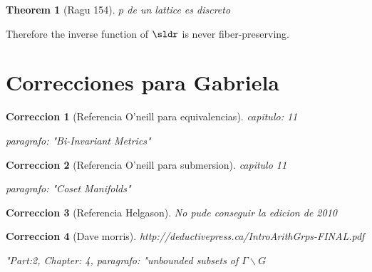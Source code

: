 \documentclass[11pt]{amsart}
\newtheorem{correccion}{Correccion}
\theoremstyle{plain}
\newtheorem{thm}{Theorem}[section]
\theoremstyle{definition}
\theoremstyle{remark}
\begin{document}
\begin{thm} [Ragu 154]
$p$ de un lattice es discreto
\end{thm}


Therefore the inverse function of $\sldr$ is never fiber-preserving.

\newpage

\section{Correcciones para Gabriela}

\begin{correccion}[Referencia O'neill para equivalencias]
\begin{sloppypar}
\item capitulo: 11
\item paragrafo: "Bi-Invariant Metrics"
\end{sloppypar}
\end{correccion}

\begin{correccion}[Referencia O'neill para submersion]
\begin{sloppypar}
\item capitulo 11
\item paragrafo: "Coset Manifolds"
\end{sloppypar}
\end{correccion}

\begin{correccion}[Referencia Helgason]
No pude conseguir la edicion de 2010
\end{correccion}

\begin{correccion}[Dave morris]
\begin{sloppypar}
\item http://deductivepress.ca/IntroArithGrps-FINAL.pdf
\item "Part:2, Chapter: 4, paragrafo: "unbounded subsets of $\Gamma \backslash G$
\end{sloppypar}
\end{correccion}
\end{document}
